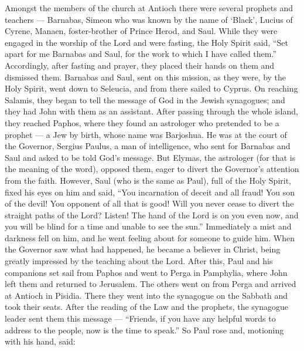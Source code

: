  Amongst the members of the church at Antioch there were
several prophets and teachers --- Barnabas, Simeon who was known by the
name of `Black', Lucius of Cyrene, Manaen, foster-brother of Prince
Herod, and Saul.  While they were engaged in the worship of
the Lord and were fasting, the Holy Spirit said, ``Set apart for me
Barnabas and Saul, for the work to which I have called them.''
 Accordingly, after fasting and prayer, they placed their
hands on them and dismissed them.  Barnabas and Saul, sent
on this mission, as they were, by the Holy Spirit, went down to
Seleucia, and from there sailed to Cyprus.  On reaching
Salamis, they began to tell the message of God in the Jewish synagogues;
and they had John with them as an assistant.  After passing
through the whole island, they reached Paphos, where they found an
astrologer who pretended to be a prophet --- a Jew by birth, whose name
was Barjoshua.  He was at the court of the Governor, Sergius
Paulus, a man of intelligence, who sent for Barnabas and Saul and asked
to be told God's message.  But Elymas, the astrologer (for
that is the meaning of the word), opposed them, eager to divert the
Governor's attention from the faith.  However, Saul (who is
the same as Paul), full of the Holy Spirit, fixed his eyes on him and
said,  ``You incarnation of deceit and all fraud! You son
of the devil! You opponent of all that is good! Will you never cease to
divert the straight paths of the Lord? Listen!  The hand of
the Lord is on you even now, and you will be blind for a time and unable
to see the sun.'' Immediately a mist and darkness fell on him, and he
went feeling about for someone to guide him.  When the
Governor saw what had happened, he became a believer in Christ, being
greatly impressed by the teaching about the Lord.  After
this, Paul and his companions set sail from Paphos and went to Perga in
Pamphylia, where John left them and returned to Jerusalem. 
The others went on from Perga and arrived at Antioch in Pisidia. There
they went into the synagogue on the Sabbath and took their seats.
 After the reading of the Law and the prophets, the
synagogue leader sent them this message --- ``Friends, if you have any
helpful words to address to the people, now is the time to speak.''
 So Paul rose and, motioning with his hand, said:

